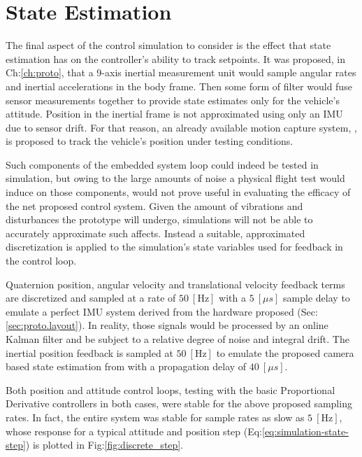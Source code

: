 \section{State Estimation}
\label{sec:simulation.state}
The final aspect of the control simulation to consider is the effect that state estimation has on the controller's ability to track setpoints. It was proposed, in Ch:\ref{ch:proto}, that a 9-axis inertial measurement unit would sample angular rates and inertial accelerations in the body frame. Then some form of filter would fuse sensor measurements together to provide state estimates only for the vehicle's attitude. Position in the inertial frame is not approximated using only an IMU due to sensor drift. For that reason, an already available motion capture system, \cite{arnold}, is proposed to track the vehicle's position under testing conditions. 
\par
Such components of the embedded system loop could indeed be tested in simulation, but owing to the large amounts of noise a physical flight test would induce on those components, would not prove useful in evaluating the efficacy of the net proposed control system. Given the amount of vibrations and disturbances the prototype will undergo, simulations will not be able to accurately approximate such affects. Instead a suitable, approximated discretization is applied to the simulation's state variables used for feedback in the control loop.
\par
Quaternion position, angular velocity and translational velocity feedback terms are discretized and sampled at a rate of $50~[\text{Hz}]$ with a $5~[\mu s]$ sample delay to emulate a perfect IMU system derived from the hardware proposed (Sec:\ref{sec:proto.layout}). In reality, those signals would be processed by an online Kalman filter and be subject to a relative degree of noise and integral drift. The inertial position feedback is sampled at $50~[\text{Hz}]$ to emulate the proposed camera based state estimation from \cite{arnold} with a propagation delay of $40~[\mu s]$.
\par
Both position and attitude control loops, testing with the basic Proportional Derivative controllers in both cases, were stable for the above proposed sampling rates. In fact, the entire system was stable for sample rates as slow as $5~[\text{Hz}]$, whose response for a typical attitude and position step (Eq:\ref{eq:simulation-state-step}) is plotted in Fig:\ref{fig:discrete_step}.
\newpage
